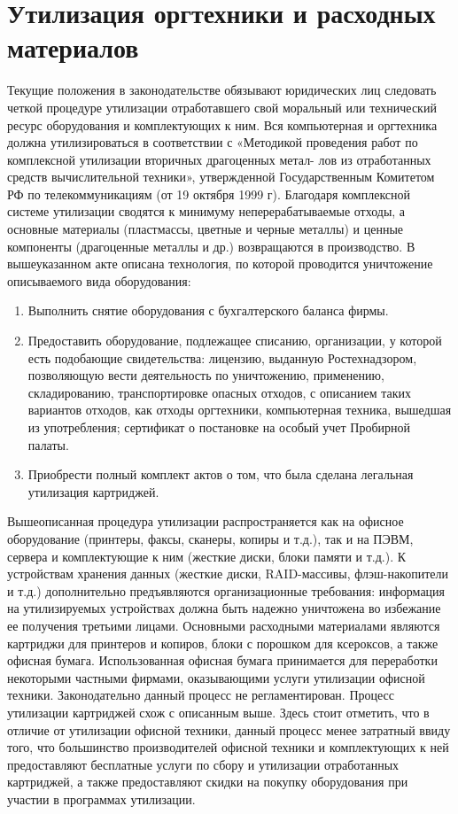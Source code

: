 \section{Утилизация оргтехники и расходных материалов}
Текущие положения в законодательстве обязывают юридических лиц следовать четкой процедуре утилизации отработавшего свой моральный или технический ресурс оборудования и комплектующих к ним.
Вся компьютерная и оргтехника должна утилизироваться в соответствии с «Методикой проведения работ по комплексной утилизации вторичных драгоценных метал- лов из отработанных средств вычислительной техники», утвержденной Государственным Комитетом РФ по телекоммуникациям (от 19 октября 1999 г). Благодаря комплексной системе утилизации сводятся к минимуму неперерабатываемые отходы, а основные материалы (пластмассы, цветные и черные металлы) и ценные компоненты (драгоценные металлы и др.) возвращаются в производство. В вышеуказанном акте описана технология, по которой проводится уничтожение описываемого вида оборудования:
\begin{enumerate}
	\item Выполнить снятие оборудования с бухгалтерского баланса фирмы.
	\item Предоставить оборудование, подлежащее списанию, организации, у которой есть подобающие свидетельства: лицензию, выданную Ростехнадзором, позволяющую вести деятельность по уничтожению, применению, складированию, транспортировке опасных отходов, с описанием таких вариантов отходов, как отходы оргтехники, компьютерная техника, вышедшая из употребления; сертификат о постановке на особый учет Пробирной палаты.
	\item Приобрести полный комплект актов о том, что была сделана легальная утилизация картриджей.
\end{enumerate}

Вышеописанная процедура утилизации распространяется как на офисное оборудование (принтеры, факсы, сканеры, копиры и т.д.), так и на ПЭВМ, сервера и комплектующие к ним (жесткие диски, блоки памяти и т.д.). К устройствам хранения данных (жесткие диски, RAID-массивы, флэш-накопители и т.д.) дополнительно предъявляются организационные требования: информация на утилизируемых устройствах должна быть надежно уничтожена во избежание ее получения третьими лицами.
Основными расходными материалами являются картриджи для принтеров и копиров, блоки с порошком для ксероксов, а также офисная бумага. Использованная офисная бумага принимается для переработки некоторыми частными фирмами, оказывающими услуги утилизации офисной техники. Законодательно данный процесс не регламентирован.
Процесс утилизации картриджей схож с описанным выше. Здесь стоит отметить, что в отличие от утилизации офисной техники, данный процесс менее затратный ввиду того, что большинство производителей офисной техники и комплектующих к ней предоставляют бесплатные услуги по сбору и утилизации отработанных картриджей, а также предоставляют скидки на покупку оборудования при участии в программах утилизации.
